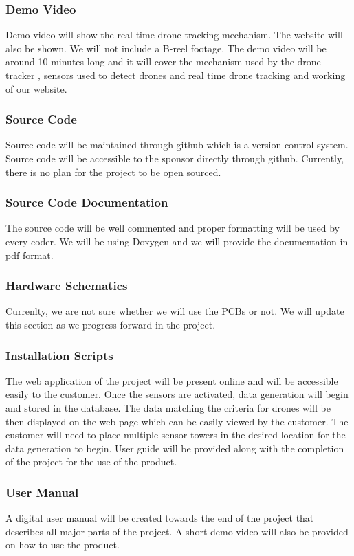 \subsubsection{Demo Video}
Demo video will show the real time drone tracking mechanism. The website will also be shown. We will not include a B-reel footage. The demo video will be around 10 minutes long and it will cover the mechanism used by the drone tracker , sensors used to detect drones and real time drone tracking and working of our website.

\subsubsection{Source Code}
Source code will be maintained through github which is a version control system. Source code will be accessible to the sponsor directly through github. Currently, there is no plan for the project to be open sourced.

\subsubsection{Source Code Documentation}
The source code will be well commented and proper formatting will be used by every coder. We will be using Doxygen and we will provide the documentation in pdf format.

\subsubsection{Hardware Schematics}
Currenlty, we are not sure whether we will use the PCBs or not. We will update this section as we progress forward in the project. 

\subsubsection{Installation Scripts}
The web application of the project will be present online and will be accessible easily to the customer. Once the sensors are activated, data generation will begin and stored in the database. The data matching the criteria for drones will be then displayed on the web page which can be easily viewed by the customer. The customer will need to place multiple sensor towers in the desired location for the data generation to begin. User guide will be provided along with the completion of the project for the use of the product.  

\subsubsection{User Manual}
A digital user manual will be created towards the end of the project that describes all major parts of the project. A short demo video will also be provided on how to use the product.
